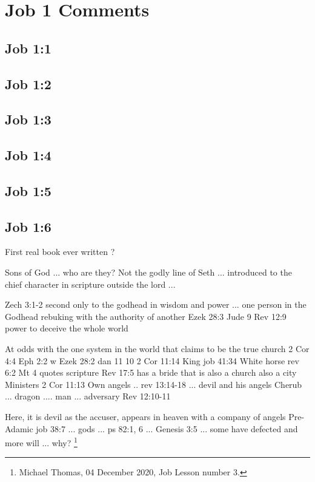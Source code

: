 \section{Job 1 Comments}

\subsection{Job 1:1}

\subsection{Job 1:2}

\subsection{Job 1:3}

\subsection{Job 1:4}

\subsection{Job 1:5}

\subsection{Job 1:6}
First real book ever written ?

Sons of God ... who are they? Not the godly line of Seth ... introduced to the chief character in scripture outside the lord ... 

Zech 3:1-2 second only to the godhead in wisdom and power ... one person in the Godhead rebuking with the authority of another
Ezek 28:3
Jude 9
Rev 12:9 power to deceive the whole world

At odds with the one system in the world that claims to be the true church
2 Cor 4:4
Eph 2:2 w Ezek 28:2 dan 11
10
2 Cor 11:14
King job 41:34
White horse rev 6:2 
Mt 4 quotes scripture
Rev 17:5 has a bride that is also a church also a city
Ministers 2 Cor 11:13
Own angels .. rev 13:14-18 ... devil and his angels
Cherub ... dragon .... man ... adversary
Rev 12:10-11

Here, it is devil as the accuser, 
appears in heaven with a company of angels
Pre-Adamic job 38:7 ... gods ... ps 82:1, 6 ... Genesis 3:5 ... some have defected and more will ... why?  \footnote{Michael Thomas, 04 December 2020, Job Lesson number 3.}

